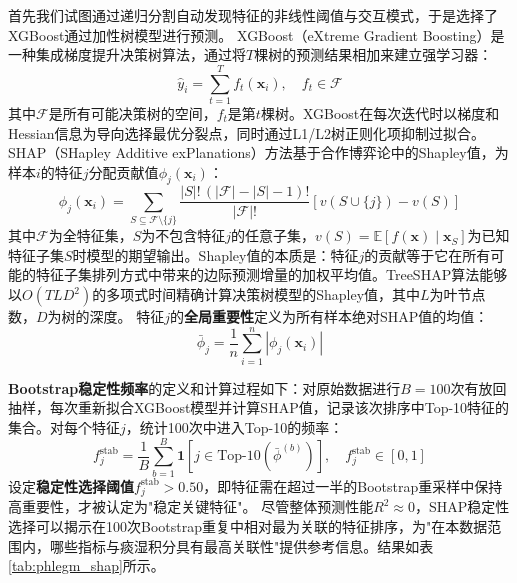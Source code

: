 \documentclass[12pt,a4paper]{ctexart}
\begin{document}
首先我们试图通过递归分割自动发现特征的非线性阈值与交互模式，于是选择了XGBoost通过加性树模型进行预测。
XGBoost（eXtreme Gradient Boosting）是一种集成梯度提升决策树算法，通过将$T$棵树的预测结果相加来建立强学习器：
\begin{equation}
\hat{y}_i = \sum_{t=1}^{T} f_t(\mathbf{x}_i), \quad f_t \in \mathcal{F}
\label{eq:xgboost}
\end{equation}
其中$\mathcal{F}$是所有可能决策树的空间，$f_t$是第$t$棵树。XGBoost在每次迭代时以梯度和Hessian信息为导向选择最优分裂点，同时通过L1/L2树正则化项抑制过拟合。
SHAP（SHapley Additive exPlanations）方法基于合作博弈论中的Shapley值，为样本$i$的特征$j$分配贡献值$\phi_j(\mathbf{x}_i)$：
\begin{equation}
\phi_j(\mathbf{x}_i) = \sum_{S \subseteq \mathcal{F} \setminus \{j\}} \frac{|S|!\,(|\mathcal{F}|-|S|-1)!}{|\mathcal{F}|!}\left[v(S \cup \{j\}) - v(S)\right]
\label{eq:shapley}
\end{equation}
其中$\mathcal{F}$为全特征集，$S$为不包含特征$j$的任意子集，$v(S) = \mathbb{E}[f(\mathbf{x}) \mid \mathbf{x}_S]$为已知特征子集$S$时模型的期望输出。Shapley值的本质是：特征$j$的贡献等于它在所有可能的特征子集排列方式中带来的边际预测增量的加权平均值。TreeSHAP算法能够以$O(TLD^2)$的多项式时间精确计算决策树模型的Shapley值，其中$L$为叶节点数，$D$为树的深度。
特征$j$的\textbf{全局重要性}定义为所有样本绝对SHAP值的均值：
\begin{equation}
\bar{\phi}_j = \frac{1}{n}\sum_{i=1}^{n}|\phi_j(\mathbf{x}_i)|
\label{eq:global_shap}
\end{equation}

\textbf{Bootstrap稳定性频率}的定义和计算过程如下：对原始数据进行$B = 100$次有放回抽样，每次重新拟合XGBoost模型并计算SHAP值，记录该次排序中Top-10特征的集合。对每个特征$j$，统计100次中进入Top-10的频率：
\begin{equation}
f_j^{\text{stab}} = \frac{1}{B}\sum_{b=1}^{B}\mathbf{1}\left[j \in \text{Top-10}\left(\bar{\phi}^{(b)}\right)\right], \quad f_j^{\text{stab}} \in [0, 1]
\label{eq:stability}
\end{equation}
设定\textbf{稳定性选择阈值}$f_j^{\text{stab}} > 0.50$，即特征需在超过一半的Bootstrap重采样中保持高重要性，才被认定为"稳定关键特征"。
尽管整体预测性能$R^2 \approx 0$，SHAP稳定性选择可以揭示在100次Bootstrap重复中相对最为关联的特征排序，为"在本数据范围内，哪些指标与痰湿积分具有最高关联性"提供参考信息。结果如表\ref{tab:phlegm_shap}所示。
\end{document}
